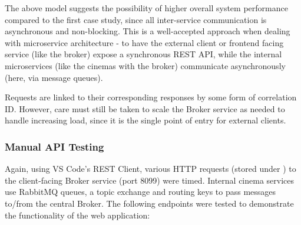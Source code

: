 The above model suggests the possibility of higher overall system performance compared to the first case study, since all inter-service communication is asynchronous and non-blocking. This is a well-accepted approach when dealing with microservice architecture - to have the external client or frontend facing service (like the broker) expose a synchronous REST API, while the internal microservices (like the cinemas with the broker) communicate asynchronously (here, via message queues).

Requests are linked to their corresponding responses by some form of correlation ID. However, care must still be taken to scale the Broker service as needed to handle increasing load, since it is the single point of entry for external clients.

\subsubsection{Manual API Testing}

Again, using VS Code's REST Client, various HTTP requests (stored under ) to the client-facing Broker service (port 8099) were timed. Internal cinema services use RabbitMQ queues, a topic exchange and routing keys to pass messages to/from the central Broker. The following endpoints were tested to demonstrate the functionality of the web application:

